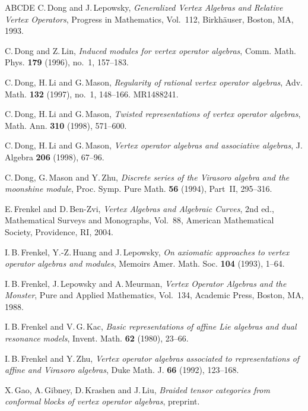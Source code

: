 \documentclass[12pt,a4paper,reqno]{amsart}
\numberwithin{equation}{section}
\numberwithin{equation}{section}
\theoremstyle{definition}
\begin{document}
\begin{thebibliography}{ABCDE}
	C.\,Dong and J.\,Lepowsky,
	{\em Generalized Vertex Algebras and Relative Vertex Operators},
	Progress in Mathematics, Vol.~112, Birkh\"auser, Boston, MA, 1993.
	
	C.\,Dong and Z.\,Lin,
	{\em Induced modules for vertex operator algebras},
	Comm. Math. Phys. \textbf{179} (1996), no.~1, 157--183.
	
	C.\,Dong, H.\,Li and G.\,Mason,
	{\em Regularity of rational vertex operator algebras},
	Adv. Math. \textbf{132} (1997), no.~1, 148--166. MR1488241.
	
	C.\,Dong, H.\,Li and G.\,Mason,
	{\em Twisted representations of vertex operator algebras},
	Math. Ann. \textbf{310} (1998), 571--600.
	
	C.\,Dong, H.\,Li and G.\,Mason,
	{\em Vertex operator algebras and associative algebras},
	J. Algebra \textbf{206} (1998), 67--96.
	
	C.\,Dong, G.\,Mason and Y.\,Zhu,
	{\em Discrete series of the Virasoro algebra and the moonshine module},
	Proc. Symp. Pure Math. \textbf{56} (1994), Part~II, 295--316.
	
	E.\,Frenkel and D.\,Ben-Zvi,
	{\em Vertex Algebras and Algebraic Curves}, 2nd ed.,
	Mathematical Surveys and Monographs, Vol.~88, American Mathematical Society, Providence, RI, 2004.
	
	I.\,B.\,Frenkel, Y.-Z.\,Huang and J.\,Lepowsky,
	{\em On axiomatic approaches to vertex operator algebras and modules},
	Memoirs Amer. Math. Soc. \textbf{104} (1993), 1--64.
	
	I.\,B.\,Frenkel, J.\,Lepowsky and A.\,Meurman,
	{\em Vertex Operator Algebras and the Monster},
	Pure and Applied Mathematics, Vol.~134, Academic Press, Boston, MA, 1988.
	
	I.\,B.\,Frenkel and V.\,G.\,Kac,
	{\em Basic representations of affine Lie algebras and dual resonance models},
	Invent. Math. \textbf{62} (1980), 23--66.
	
	I.\,B.\,Frenkel and Y.\,Zhu,
	{\em Vertex operator algebras associated to representations of affine and Virasoro algebras},
	Duke Math. J. \textbf{66} (1992), 123--168.
	
	X.\,Gao, A.\,Gibney, D.\,Krashen and J.\,Liu,
	{\em Braided tensor categories from conformal blocks of vertex operator algebras},
	preprint.
	

\end{thebibliography}
\end{document}
